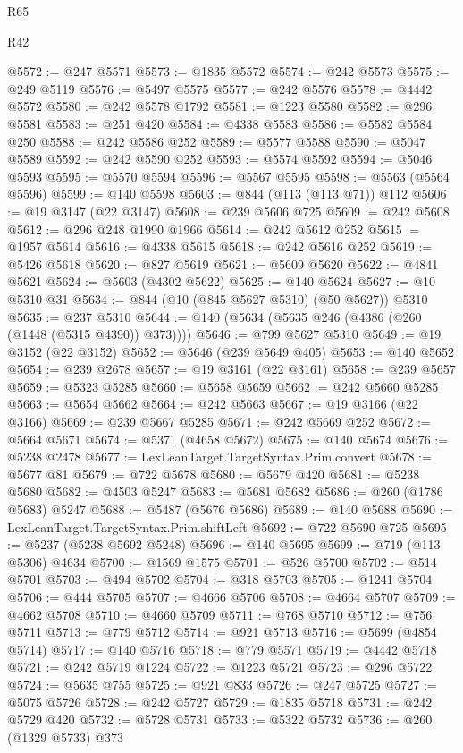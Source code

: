 \begin{lexlean}{R65}
\begin{lexlean}{R42}
\begin{coremodule}
{{{{{{{{{{{{{{{{{{{{{{{{{{{{{{{{{{{{{{{{{{{{{{{{{{{{{{{{{{{{{{{{{{{{{{{{{{{{{{{{{{{{{{{{{{{{{{{{{{{{{{{{{{{{{{{{{{{{{{{{{{{{{{{{{{{{{{{{{{{{{{{{{{{{{{{{{{{{{{{{{{{{{{{{{{{{{{{{{{{{{{{{@5572 := @247 @5571
@5573 := @1835 @5572
@5574 := @242 @5573
@5575 := @249 @5119
@5576 := @5497 @5575
@5577 := @242 @5576
@5578 := @4442 @5572
@5580 := @242 @5578 @1792
@5581 := @1223 @5580
@5582 := @296 @5581
@5583 := @251 @420
@5584 := @4338 @5583
@5586 := @5582 @5584 @250
@5588 := @242 @5586 @252
@5589 := @5577 @5588
@5590 := @5047 @5589
@5592 := @242 @5590 @252
@5593 := @5574 @5592
@5594 := @5046 @5593
@5595 := @5570 @5594
@5596 := @5567 @5595
@5598 := @5563 (@5564 @5596)
@5599 := @140 @5598
@5603 := @844 (@113 (@113 @71)) @112
@5606 := @19 @3147 (@22 @3147)
@5608 := @239 @5606 @725
@5609 := @242 @5608
@5612 := @296 @248 @1990 @1966
@5614 := @242 @5612 @252
@5615 := @1957 @5614
@5616 := @4338 @5615
@5618 := @242 @5616 @252
@5619 := @5426 @5618
@5620 := @827 @5619
@5621 := @5609 @5620
@5622 := @4841 @5621
@5624 := @5603 (@4302 @5622)
@5625 := @140 @5624
@5627 := @10 @5310 @31
@5634 := @844 (@10 (@845 @5627 @5310) (@50 @5627)) @5310
@5635 := @237 @5310
@5644 := @140 (@5634 (@5635 @246 (@4386 (@260 (@1448 (@5315 @4390)) @373))))
@5646 := @799 @5627 @5310
@5649 := @19 @3152 (@22 @3152)
@5652 := @5646 (@239 @5649 @405)
@5653 := @140 @5652
@5654 := @239 @2678
@5657 := @19 @3161 (@22 @3161)
@5658 := @239 @5657
@5659 := @5323 @5285
@5660 := @5658 @5659
@5662 := @242 @5660 @5285
@5663 := @5654 @5662
@5664 := @242 @5663
@5667 := @19 @3166 (@22 @3166)
@5669 := @239 @5667 @5285
@5671 := @242 @5669 @252
@5672 := @5664 @5671
@5674 := @5371 (@4658 @5672)
@5675 := @140 @5674
@5676 := @5238 @2478
@5677 := LexLeanTarget.TargetSyntax.Prim.convert
@5678 := @5677 @81
@5679 := @722 @5678
@5680 := @5679 @420
@5681 := @5238 @5680
@5682 := @4503 @5247
@5683 := @5681 @5682
@5686 := @260 (@1786 @5683) @5247
@5688 := @5487 (@5676 @5686)
@5689 := @140 @5688
@5690 := LexLeanTarget.TargetSyntax.Prim.shiftLeft
@5692 := @722 @5690 @725
@5695 := @5237 (@5238 @5692 @5248)
@5696 := @140 @5695
@5699 := @719 (@113 @5306) @4634
@5700 := @1569 @1575
@5701 := @526 @5700
@5702 := @514 @5701
@5703 := @494 @5702
@5704 := @318 @5703
@5705 := @1241 @5704
@5706 := @444 @5705
@5707 := @4666 @5706
@5708 := @4664 @5707
@5709 := @4662 @5708
@5710 := @4660 @5709
@5711 := @768 @5710
@5712 := @756 @5711
@5713 := @779 @5712
@5714 := @921 @5713
@5716 := @5699 (@4854 @5714)
@5717 := @140 @5716
@5718 := @779 @5571
@5719 := @4442 @5718
@5721 := @242 @5719 @1224
@5722 := @1223 @5721
@5723 := @296 @5722
@5724 := @5635 @755
@5725 := @921 @833
@5726 := @247 @5725
@5727 := @5075 @5726
@5728 := @242 @5727
@5729 := @1835 @5718
@5731 := @242 @5729 @420
@5732 := @5728 @5731
@5733 := @5322 @5732
@5736 := @260 (@1329 @5733) @373
}}}}}}}}}}}}}}}}}}}}}}}}}}}}}}}}}}}}}}}}}}}}}}}}}}}}}}}}}}}}}}}}}}}}}}}}}}}}}}}}}}}}}}}}}}}}}}}}}}}}}}}}}}}}}}}}}}}}}}}}}}}}}}}}}}}}}}}}}}}}}}}}}}}}}}}}}}}}}}}}}}}}}}}}}}}}}}}}}}}}}}}}
\end{coremodule}
\end{lexlean}
\end{lexlean}
